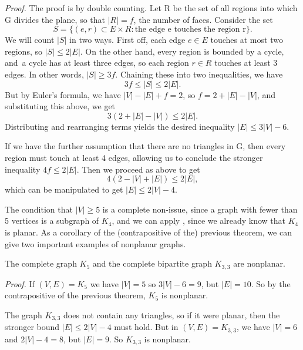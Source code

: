 \documentclass{tufte-handout}
\begin{document}
\textit{Proof.} The proof is by double counting. Let R be the set
of all regions into which G divides the plane, so that \( \left|R\right| =f\),
the number of faces. Consider the set
\[S = \{(e,r) \subset E \times R: \text{the edge e touches the region r}\}.\]
We will count \( \left|S\right| \) in two ways. First off, each edge \( e\in E \) touches
at most two regions, so \( \left|S\right| \leq 2\left|E\right| \).
On the other hand, every region is bounded by a cycle, and\
a cycle has at least three edges, so each region \( r \in R \) touches
at least 3 edges. In other words, \( \left|S\right| \geq 3f \).
Chaining these into two inequalities, we have
\[3f \leq \left|S\right| \leq 2\left|E\right|.\]
But by Euler's formula, we have \( \left|V\right| - \left|E\right| + f = 2 \), so
\(f = 2 + \left|E\right| - \left|V\right|\), and substituting this
above, we get
\[3(2 + \left|E\right| - \left|V\right|) \leq 2\left|E\right|.\]
Distributing and rearranging terms yields the desired
inequality \( \left|E\right| \leq 3\left|V\right| - 6 \).

If we have the further assumption that there are no triangles in G,
then every region must touch at least 4 edges, allowing us
to conclude the stronger inequality \( 4f \leq 2 \left|E\right| \).
Then we proceed as above to get
\[ 4(2 - \left|V\right| + \left|E\right|) \leq 2\left|E\right|,\]
which can be manipulated to get
\( \left|E\right| \leq 2\left|V\right| - 4 \). \qedsymbol

The condition that \( \left|V\right| \geq 5 \) is a complete non-issue, since a graph with
fewer than 5 vertices is a subgraph of \( K_4 \), and we can apply ,
since we already know that \( K_4 \) is planar. As a corollary of the (contrapositive of the) 
previous theorem, we can give two important examples of nonplanar graphs.

\begin{Corollary}
    The complete graph \( K_5 \) and the complete bipartite graph \( K_{3,3} \) are nonplanar.
\end{Corollary}

\textit{Proof.} If \((V,E) = K_5\) we have \( \left|V\right| = 5 \) so \( 3 \left|V\right| - 6 = 9 \), but
\( \left|E\right| = 10 \). So by the contrapositive of the previous theorem, \( K_5 \) is nonplanar.

The graph \( K_{3,3} \) does not contain any triangles, so if it were planar, then the stronger bound
\( \left|E\right| \leq 2\left|V\right| - 4 \) must hold. But in \((V,E) = K_{3,3}\), we have
\( \left|V\right| = 6 \) and \( 2\left|V\right| - 4 = 8 \), but \( \left|E\right| = 9 \). So \( K_{3,3} \) is nonplanar. \qedsymbol
\end{document}
